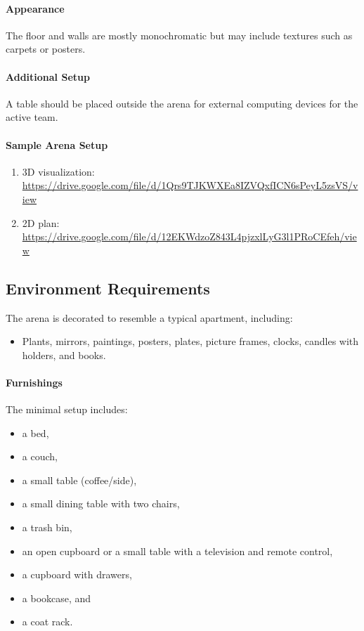 \paragraph{Appearance} The floor and walls are mostly monochromatic but may include textures such as carpets or posters.

\paragraph{Additional Setup} A table should be placed outside the arena for external computing devices for the active team.

\paragraph{Sample Arena Setup} 
\begin{enumerate}
    \item 3D visualization: \url{https://drive.google.com/file/d/1Qrs9TJKWXEa8IZVQxfICN6sPeyL5zsVS/view}
    \item 2D plan: \url{https://drive.google.com/file/d/12EKWdzoZ843L4pjzxlLyG3l1PRoCEfeh/view}
\end{enumerate}

\subsection{Environment Requirements}
The arena is decorated to resemble a typical apartment, including:
\begin{itemize}
    \item Plants, mirrors, paintings, posters, plates, picture frames, clocks, candles with holders, and books.
\end{itemize}

\paragraph{Furnishings} The minimal setup includes:
\begin{itemize}
    \item a bed,
    \item a couch,
    \item a small table (coffee/side),
    \item a small dining table with two chairs,
    \item a trash bin,
    \item an open cupboard or a small table with a television and remote control,
    \item a cupboard with drawers,
    \item a bookcase, and
    \item a coat rack.
\end{itemize}

